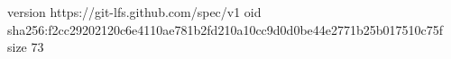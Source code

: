 version https://git-lfs.github.com/spec/v1
oid sha256:f2cc29202120c6e4110ae781b2fd210a10cc9d0d0be44e2771b25b017510c75f
size 73
